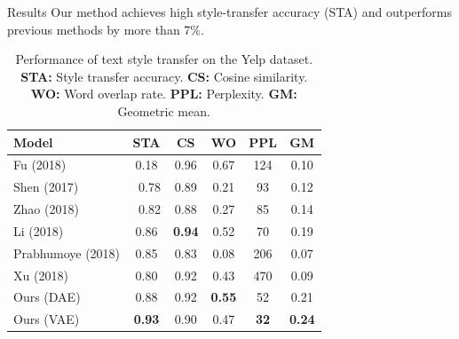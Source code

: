 \documentclass[final]{beamer}
\newlength{\onecolwid}
\newlength{\twocolwid}
\begin{document}
\begin{frame}[t]
\begin{columns}[t]
\begin{column}{\twocolwid}
\begin{columns}[t,totalwidth=\twocolwid]
\begin{column}{\onecolwid}
\begin{block}{Results}
                        Our method achieves high style-transfer accuracy (STA) and outperforms previous methods by more than 7\%.

                        \begin{table}[ht]
                            \centering
                            \begin{tabular}{l c c c c c}
                                \textbf{Model}    & \textbf{STA}     & \textbf{CS}       & \textbf{WO}       & \textbf{PPL}     & \textbf{GM}       \\
                                \hline
                                Fu (2018)         & \color{gray}0.18 & \color{gray} 0.96 & \color{gray} 0.67 & \color{gray} 124 & \color{gray} 0.10 \\
                                Shen (2017)       & \ 0.78           & 0.89              & 0.21              & 93               & 0.12              \\
                                Zhao (2018)       & \ 0.82           & 0.88              & 0.27              & 85               & 0.14              \\
                                Li (2018)         & 0.86             & \textbf{0.94}     & 0.52              & 70               & 0.19              \\
                                Prabhumoye (2018) & 0.85             & 0.83              & 0.08              & 206              & 0.07              \\
                                Xu (2018)         & 0.80             & 0.92              & 0.43              & 470              & 0.09              \\
                                Ours (DAE)        & 0.88             & 0.92              & \textbf{0.55}     & 52               & 0.21              \\
                                Ours (VAE)        & \textbf{0.93}    & 0.90              & 0.47              & \textbf{32}      & \textbf{0.24}     \\
                            \end{tabular}
                            \caption{Performance of text style transfer on the Yelp dataset. \textbf{STA:} Style transfer accuracy. \textbf{CS:} Cosine similarity. \textbf{WO:} Word overlap rate. \textbf{PPL:} Perplexity. \textbf{GM:} Geometric mean.}
                            \label{tab:comparison-previous}
                        \end{table}



\end{block}
\end{column}
\end{columns}
\end{column}
\end{columns}
\end{frame}
\end{document}
